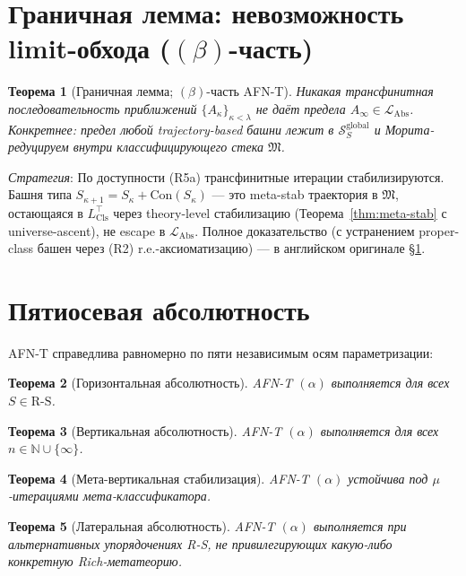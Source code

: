 \documentclass[11pt]{article}
\theoremstyle{plain}
\newtheorem{theorem}{Теорема}[section]
\theoremstyle{definition}
\newcommand{\RS}{\mathrm{R\text{-}S}}
\newcommand{\cS}{\mathcal{S}}
\newcommand{\fM}{\mathfrak{M}}
\newcommand{\LAbs}{\mathcal{L}_{\mathrm{Abs}}}
\begin{document}
\section{Граничная лемма: невозможность limit-обхода ($(\beta)$-часть)}\label{sec:afnt-beta}

\begin{theorem}[Граничная лемма; $(\beta)$-часть AFN-T]\label{thm:afnt-beta}
Никакая трансфинитная последовательность приближений $\{A_\kappa\}_{\kappa < \lambda}$ не даёт предела $A_\infty \in \LAbs$. Конкретнее: предел любой trajectory-based башни лежит в $\cS_S^\mathrm{global}$ и Морита-редуцируем внутри классифицирующего стека $\fM$.
\end{theorem}

\emph{Стратегия}: По доступности (R5a) трансфинитные итерации стабилизируются. Башня типа $S_{\kappa+1} = S_\kappa + \mathrm{Con}(S_\kappa)$ — это meta-stab траектория в $\fM$, остающаяся в $L_\mathrm{Cls}^\top$ через theory-level стабилизацию (Теорема~\ref{thm:meta-stab} с universe-ascent), не escape в $\LAbs$. Полное доказательство (с устранением proper-class башен через (R2) r.e.-аксиоматизацию) — в английском оригинале \S\ref{sec:afnt-beta}.

\section{Пятиосевая абсолютность}\label{sec:five-axis}

AFN-T справедлива равномерно по пяти независимым осям параметризации:

\begin{theorem}[Горизонтальная абсолютность]\label{thm:horizontal}
AFN-T $(\alpha)$ выполняется для всех $S \in \RS$.
\end{theorem}

\begin{theorem}[Вертикальная абсолютность]\label{thm:vertical}
AFN-T $(\alpha)$ выполняется для всех $n \in \mathbb{N} \cup \{\infty\}$.
\end{theorem}

\begin{theorem}[Мета-вертикальная стабилизация]\label{thm:meta-vertical}
AFN-T $(\alpha)$ устойчива под $\mu$-итерациями мета-классификатора.
\end{theorem}

\begin{theorem}[Латеральная абсолютность]\label{thm:lateral}
AFN-T $(\alpha)$ выполняется при альтернативных упорядочениях R-S, не привилегирующих какую-либо конкретную Rich-метатеорию.
\end{theorem}
\end{document}
